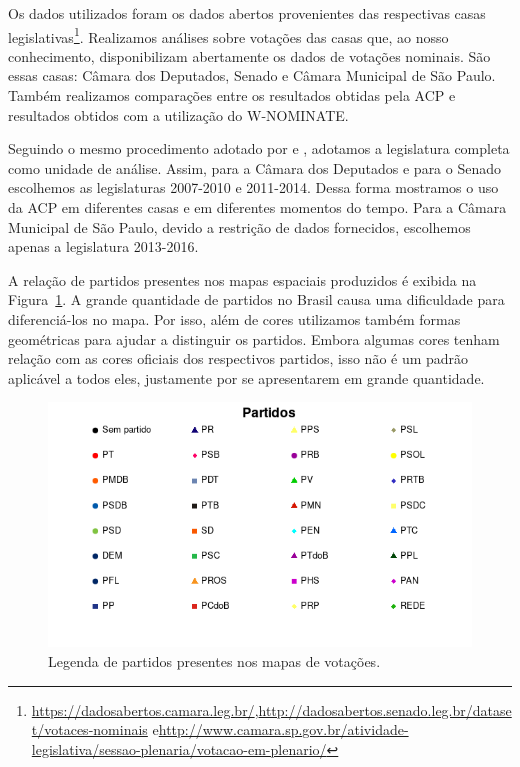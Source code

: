 \documentclass[
	article,			%
	12pt,				%
    twoside,			%
	a4paper,			%
	english,			%
	french,				%
	spanish,			%
	brazil,				%
	]{abntex2}
\newcommand\wnominate{W-NOMINATE\xspace}
\begin{document}
Os dados utilizados foram os dados abertos provenientes das respectivas casas legislativas\footnote{\url{https://dadosabertos.camara.leg.br/},\newline \url{http://dadosabertos.senado.leg.br/dataset/votaces-nominais} e\newline \url{http://www.camara.sp.gov.br/atividade-legislativa/sessao-plenaria/votacao-em-plenario/}}. Realizamos análises sobre votações das casas que, ao nosso conhecimento, disponibilizam abertamente os dados de votações nominais. São essas casas: Câmara dos Deputados, Senado e Câmara Municipal de São Paulo. Também realizamos comparações entre os resultados obtidas pela ACP e resultados obtidos com a utilização do \wnominate.  

Seguindo o mesmo procedimento adotado por  e , adotamos a legislatura completa como unidade de análise. Assim, para a Câmara dos Deputados e para o Senado escolhemos as legislaturas 2007-2010 e 2011-2014. Dessa forma mostramos o uso da ACP em diferentes casas e em diferentes momentos do tempo. Para a Câmara Municipal de São Paulo, devido a restrição de dados fornecidos, escolhemos apenas a legislatura 2013-2016. 

A relação de partidos presentes nos mapas espaciais produzidos é exibida na Figura~\ref{fig:partidos}. A grande quantidade de partidos no Brasil causa uma dificuldade para diferenciá-los no mapa. Por isso, além de cores utilizamos também formas geométricas para ajudar a distinguir os partidos. Embora algumas cores tenham relação com as cores oficiais dos respectivos partidos, isso não é um padrão aplicável a todos eles, justamente por se apresentarem em grande quantidade.

\begin{figure}[h!]
  \centering
  \includegraphics[scale=0.8]{figs/partidos.png}
  \caption{Legenda de partidos presentes nos mapas de votações.}
  \label{fig:partidos}
\end{figure}
\end{document}
